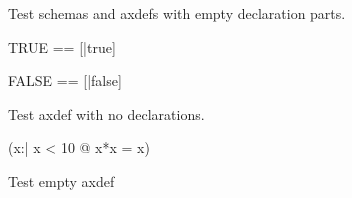 \documentclass{article}
\begin{document}
Test schemas and axdefs with empty declaration parts.

\begin{zed}
  TRUE == [|true]
\end{zed}

\begin{zed}
  FALSE == [|false]
\end{zed}

Test axdef with no declarations.
\begin{axdef}
\where
   (\exists x:\nat | x < 10 @ x*x = x)
\end{axdef}

Test empty axdef 
\begin{axdef}
\end{axdef}
\end{document}
